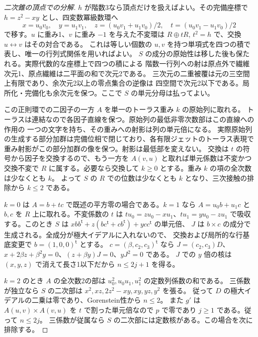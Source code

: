 \begin{proof}[二次錐の頂点での分解]
$h$ が階数3なら頂点だけを扱えばよい。その完備座標で
$h=z^2-xy$ とし、四変数冪級数環へ
\[
 x=u_0v_0,\quad y=u_1v_1,\quad
 z=(u_0v_1+u_1v_0)/2,\quad t=(u_0v_1-u_1v_0)/2
\]
で移す。$u$ に重み1、$v$ に重み $-1$ を与えた不変環は
$R\oplus tR$, $t^2=h$ で、交換 $u\leftrightarrow v$ はその対合である。
これは等しい個数の $u,v$ を持つ単項式を四つの積で表し、唯一の行列式関係を用いればよい。
$S$ の成分の原始性は移した後も保たれる。実際代数的な座標上で四つの積による
階数一行列への射は原点外で繊維次元1、原点繊維は二平面の和で次元2である。
三次元の二重被覆は元の三空間上有限であり、余次元2以上の零点集合の逆像は
四空間で次元2以下である。局所化・完備化も余次元を保つ。ここで $S$ の単元分母は払ってよい。

この正則環での二因子の一方 $A$ を単一のトーラス重み $k$ の原始列に取れる。
トーラスは連結なので各因子直線を保つ。原始列の最低非零次数部はこの直線への作用の
一つの文字を持ち、その重みへの射影は列の単元倍になる。
実際原始列の生成する部分加群は完備位相で閉じており、各有限ジェットのトーラス表現で
重み射影がこの部分加群の像を保つ。射影は最低部を変えない。
交換は $t$ の符号から因子を交換するので、もう一方を $A(v,u)$ と取れば単元係数は不変かつ交換不変で
$R$ に属する。必要なら交換して $k\ge0$ とする。重み $k$ の項の全次数は少なくとも $k$。
よって $S$ の $R$ での位数は少なくとも $k$ となり、三次接触の排除から $k\le2$ である。

$k=0$ は $A=b+t c$ で既述の平方零の場合である。$k=1$ なら $A=u_0 b+u_1 c$ と
$b,c$ を $R$ 上に取れる。不変係数の $t$ は $tu_0=zu_0-xu_1$、$tu_1=yu_0-zu_1$
で吸収する。このとき $S$ は
$x b b^{\mathsf t}+z(bc^{\mathsf t}+cb^{\mathsf t})+y c c^{\mathsf t}$ の単元倍、
$J$ は $b\times c$ の成分で生成される。全成分が極大イデアルに入れないので、
交換および局所的な行基底変更で $b=(1,0,0)^{\mathsf t}$ とする。
$c=(\beta,c_2,c_3)^{\mathsf t}$ なら $J=(c_2,c_3)D$、
$x+2\beta z+\beta^2 y=0$、$(z+\beta y)J=0$、$yJ^2=0$ である。
$J$ での $y$ 倍の核は $(x,y,z)$ で消えて長さ1以下だから $n\le2j+1$ を得る。

$k=2$ のとき $A$ の全次数2の部は $u_0^2,u_0u_1,u_1^2$ の定数列係数の和である。
三係数が独立なら $S$ の二次部は $x^2,xz,2z^2-xy,xy,yz,y^2$ を張る。
従って $D$ の極大イデアルの二乗は零であり、Gorenstein性から $n\le2$。
また $g'$ は $A(u,v)\times A(v,u)$ を $t$ で割った単元倍なので
$p$ で零であり $j\ge1$ である。従って $n\le2j$。
三係数が従属なら $S$ の二次部には定数核がある。この場合を次に排除する。
\end{proof}

